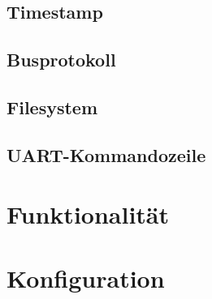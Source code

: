 
\subsection{Timestamp}\label{subsec.sw_timestamp}


\subsection{Busprotokoll}\label{subsec.sw_busprotokoll}

\subsection{Filesystem}\label{subsec.sw_filesystem}


\subsection{UART-Kommandozeile}\label{subsec.sw_uart}


\section{Funktionalität}\label{sec.sw_funktionalitaet}


\section{Konfiguration}\label{sec.sw_konfiguration}
